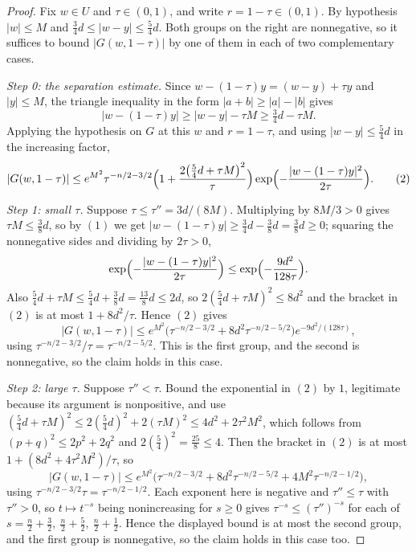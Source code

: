 \begin{proof}
Fix $w \in U$ and $\tau \in (0,1)$, and write $r = 1-\tau \in (0,1)$.  By
hypothesis $|w| \leq M$ and $\tfrac34 d \leq |w-y| \leq \tfrac54 d$.  Both
groups on the right are nonnegative, so it suffices to bound $|G(w,1-\tau)|$ by
one of them in each of two complementary cases.

\emph{Step 0: the separation estimate.}
Since $w - (1-\tau)y = (w-y) + \tau y$ and $|y| \leq M$, the triangle inequality
in the form $|a+b| \geq |a|-|b|$ gives
\begin{equation*}
  |w-(1-\tau)y| \geq |w-y| - \tau M \geq \tfrac34 d - \tau M . \tag{1}
\end{equation*}
Applying the hypothesis on $G$ at this $w$ and $r = 1-\tau$, and using
$|w-y| \leq \tfrac54 d$ in the increasing factor,
\begin{equation*}
  |G(w,1-\tau)| \leq e^{M^2}\tau^{-n/2-3/2}
    \Bigl(1 + \frac{2\bigl(\tfrac54 d+\tau M\bigr)^2}{\tau}\Bigr)
    \exp\Bigl(-\frac{|w-(1-\tau)y|^2}{2\tau}\Bigr) . \tag{2}
\end{equation*}

\emph{Step 1: small $\tau$.}
Suppose $\tau \leq \tau'' = 3d/(8M)$.  Multiplying by $8M/3 > 0$ gives
$\tau M \leq \tfrac38 d$, so by $(1)$ we get
$|w-(1-\tau)y| \geq \tfrac34 d - \tfrac38 d = \tfrac38 d \geq 0$; squaring the
nonnegative sides and dividing by $2\tau > 0$,
\[
  \exp\Bigl(-\frac{|w-(1-\tau)y|^2}{2\tau}\Bigr)
    \leq \exp\Bigl(-\frac{9d^2}{128\tau}\Bigr) .
\]
Also $\tfrac54 d + \tau M \leq \tfrac54 d + \tfrac38 d = \tfrac{13}8 d \leq 2d$,
so $2(\tfrac54 d+\tau M)^2 \leq 8d^2$ and the bracket in $(2)$ is at most
$1 + 8d^2/\tau$.  Hence $(2)$ gives
\[
  |G(w,1-\tau)|
    \leq e^{M^2}\bigl(\tau^{-n/2-3/2} + 8d^2\tau^{-n/2-5/2}\bigr)
        e^{-9d^2/(128\tau)} ,
\]
using $\tau^{-n/2-3/2}/\tau = \tau^{-n/2-5/2}$.  This is the first group, and
the second is nonnegative, so the claim holds in this case.

\emph{Step 2: large $\tau$.}
Suppose $\tau'' < \tau$.  Bound the exponential in $(2)$ by $1$, legitimate
because its argument is nonpositive, and use
$(\tfrac54 d+\tau M)^2 \leq 2(\tfrac54 d)^2 + 2(\tau M)^2 \leq 4d^2+2\tau^2M^2$,
which follows from $(p+q)^2 \leq 2p^2+2q^2$ and $2(\tfrac54)^2 = \tfrac{25}8
\leq 4$.  Then the bracket in $(2)$ is at most
$1 + (8d^2 + 4\tau^2M^2)/\tau$, so
\[
  |G(w,1-\tau)| \leq e^{M^2}\bigl(\tau^{-n/2-3/2} + 8d^2\tau^{-n/2-5/2}
    + 4M^2\tau^{-n/2-1/2}\bigr) ,
\]
using $\tau^{-n/2-3/2}\tau = \tau^{-n/2-1/2}$.  Each exponent here is negative
and $\tau'' \leq \tau$ with $\tau'' > 0$, so $t \mapsto t^{-s}$ being
nonincreasing for $s \geq 0$ gives $\tau^{-s} \leq (\tau'')^{-s}$ for each of
$s = \tfrac n2+\tfrac32,\ \tfrac n2+\tfrac52,\ \tfrac n2+\tfrac12$.  Hence the
displayed bound is at most the second group, and the first group is nonnegative,
so the claim holds in this case too.
\end{proof}
